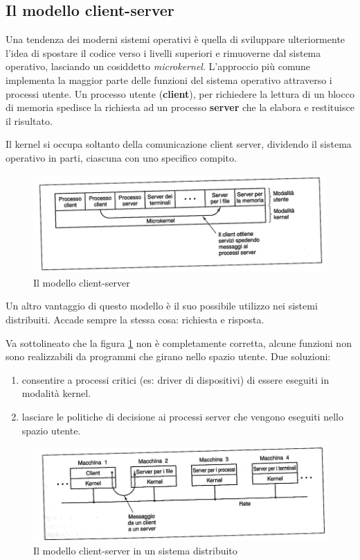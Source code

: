 \subsection{Il modello client-server}
Una tendenza dei moderni sistemi operativi è quella di sviluppare ulteriormente l'idea di spostare il codice verso i livelli superiori e rimuoverne dal sistema operativo, lasciando un cosiddetto \textit{microkernel}.
L'approccio più comune implementa la maggior parte delle funzioni del sistema operativo attraverso i processi utente. Un processo utente (\textbf{client}), per richiedere la lettura di un blocco di memoria spedisce la richiesta ad un processo \textbf{server} che la elabora e restituisce il risultato.

Il kernel si occupa soltanto della comunicazione client server, dividendo il sistema operativo in parti, ciascuna con uno specifico compito.

\begin{figure}[!ht]
  \centering
  \includegraphics[width=0.7\linewidth]{assets/clientserver2.png}
  \caption{Il modello client-server}
\end{figure}

Un altro vantaggio di questo modello è il suo possibile utilizzo nei sistemi distribuiti. Accade sempre la stessa cosa: richiesta e risposta.

Va sottolineato che la figura \ref{distribuito2} non è completamente corretta, alcune funzioni non sono realizzabili da programmi che girano nello spazio utente.
Due soluzioni: 
\begin{enumerate}
  \item consentire a processi critici (es: driver di dispositivi) di essere eseguiti in modalità kernel.
  \item lasciare le politiche di decisione ai processi server che vengono eseguiti nello spazio utente.
\end{enumerate}

\begin{figure}[H]
  \centering
  \includegraphics[width=0.5\linewidth]{assets/distribuito2.png}
  \caption{Il modello client-server in un sistema distribuito}
  \label{distribuito2}
\end{figure}